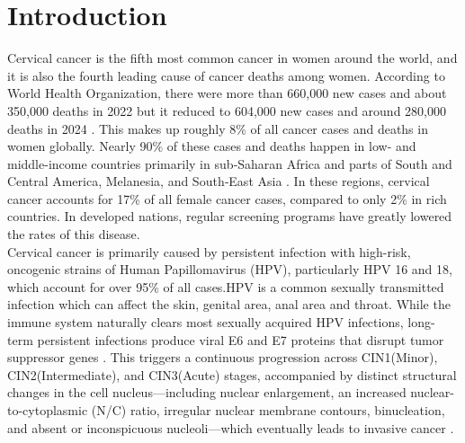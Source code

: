 \documentclass[pdflatex,sn-nature]{sn-jnl}%
\theoremstyle{thmstyleone}%
\theoremstyle{thmstyletwo}%
\theoremstyle{thmstylethree}%
\begin{document}
\section{Introduction}\label{sec1}

Cervical cancer is the fifth most common cancer in women around the world, and it is also the fourth leading cause of cancer deaths among women. According to World Health Organization, there were more than 660,000 new cases and about 350,000 deaths in 2022 but it reduced to 604,000 new cases and around 280,000 deaths in 2024 \cite{Intro1who2024cervical}. This makes up roughly 8\% of all cancer cases and deaths in women globally. Nearly 90\% of these cases and deaths happen in low- and middle-income countries primarily in sub‐Saharan Africa and parts of South and Central America, Melanesia, and South‐East Asia \cite{Intro2iarc2024gco} . In these regions, cervical cancer accounts for 17\% of all female cancer cases, compared to only 2\% in rich countries. In developed nations, regular screening programs have greatly lowered the rates of this disease.  \\

Cervical cancer is primarily caused by persistent infection with high-risk, oncogenic strains of Human Papillomavirus (HPV), particularly HPV 16 and 18, which account for over 95\% of all cases.HPV is a common sexually transmitted infection which can affect the skin, genital area, anal area and throat. While the immune system naturally clears most sexually acquired HPV infections, long-term persistent infections produce viral E6 and E7 proteins that disrupt tumor suppressor genes \cite{Lite15}. This triggers a continuous progression across CIN1(Minor), CIN2(Intermediate), and CIN3(Acute) stages, accompanied by distinct structural changes in the cell nucleus—including nuclear enlargement, an increased nuclear-to-cytoplasmic (N/C) ratio, irregular nuclear membrane contours, binucleation, and absent or inconspicuous nucleoli—which eventually leads to invasive cancer \cite{Lite15}\cite{Intro4jiang2023systematicreview}. \\
\end{document}
